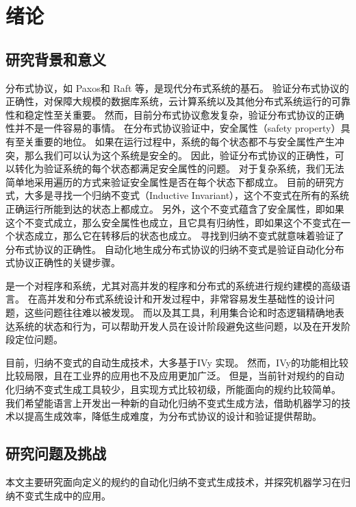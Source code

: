 \chapter{绪论}\label{chap:introduction}

\section{研究背景和意义}
分布式协议，如 Paxos\cite{paxos}和 Raft\cite{raft} 等，是现代分布式系统的基石。
验证分布式协议的正确性，对保障大规模的数据库系统，云计算系统以及其他分布式系统运行的可靠性和稳定性至关重要。
然而，目前分布式协议愈发复杂，验证分布式协议的正确性并不是一件容易的事情。
在分布式协议验证中，安全属性（safety property）\cite{safety}具有至关重要的地位。
如果在运行过程中，系统的每个状态都不与安全属性产生冲突，那么我们可以认为这个系统是安全的。
因此，验证分布式协议的正确性，可以转化为验证系统的每个状态都满足安全属性的问题。
对于复杂系统，我们无法简单地采用遍历的方式来验证安全属性是否在每个状态下都成立。
目前的研究方式，大多是寻找一个归纳不变式（Inductive Invariant）\cite{inductive}，这个不变式在所有的系统正确运行所能到达的状态上都成立。
另外，这个不变式蕴含了安全属性，即如果这个不变式成立，那么安全属性也成立，且它具有归纳性，即如果这个不变式在一个状态成立，那么它在转移后的状态也成立。
寻找到归纳不变式就意味着验证了分布式协议的正确性。\cite{towards}
自动化地生成分布式协议的归纳不变式是验证自动化分布式协议正确性的关键步骤。

\TLA \cite{TLA+}是一个对程序和系统，尤其对高并发的程序和分布式的系统进行规约建模的高级语言。
在高并发和分布式系统设计和开发过程中，非常容易发生基础性的设计问题，这些问题往往难以被发现。
而\TLA 以及其工具，利用集合论和时态逻辑精确地表达系统的状态和行为，可以帮助开发人员在设计阶段避免这些问题，以及在开发阶段定位问题。

目前，归纳不变式的自动生成技术，大多基于IVy \cite{Ivy} 实现。
然而，IVy的功能相比较\TLA 比较局限，且在工业界的应用也不及\TLA 应用更加广泛。
但是，当前针对\TLA 规约的自动化归纳不变式生成工具较少，且实现方式比较初级，所能面向的规约比较简单。
我们希望能\TLA 语言上开发出一种新的自动化归纳不变式生成方法，借助机器学习的技术以提高生成效率，降低生成难度，为分布式协议的设计和验证提供帮助。

\section{研究问题及挑战}
本文主要研究面向\TLA 定义的规约的自动化归纳不变式生成技术，并探究机器学习在归纳不变式生成中的应用。

